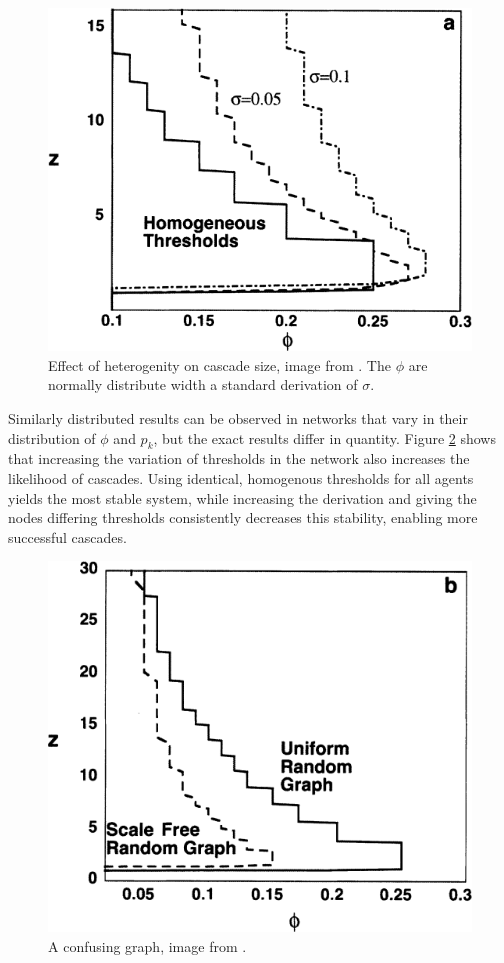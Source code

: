 \documentclass{sig-alternate-05-2015}
\begin{document}
\begin{figure}[h!]
  \centering
  \includegraphics[width=\columnwidth]{img/heterogenity}
  \caption{Effect of heterogenity on cascade size, image from \cite{simplemodel}. The $\phi$ are normally distribute width a standard derivation of $\sigma$.}
  \label{fig:heterogenity}
\end{figure}

Similarly distributed results can be observed in networks that vary in their distribution of $\phi$ and $p_k$, but the exact results differ in quantity. Figure \ref{fig:heterogenity} shows that increasing the variation of thresholds in the network also increases the likelihood of cascades. Using identical, homogenous thresholds for all agents yields the most stable system, while increasing the derivation and giving the nodes differing thresholds consistently decreases this stability, enabling more successful cascades.

\begin{figure}[h!]
  \centering
  \includegraphics[width=\columnwidth]{img/dunnolol}
  \caption{A confusing graph, image from \cite{simplemodel}.}
  \label{fig:heterogenity}
\end{figure}
\end{document}
